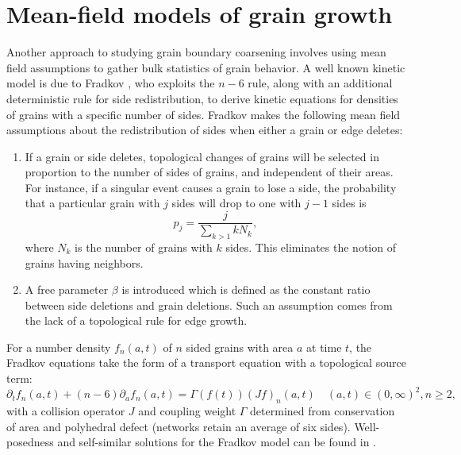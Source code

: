 \section{Mean-field models of grain growth}\label{fradkov}
Another approach to studying grain boundary coarsening involves using mean field assumptions to gather bulk statistics of grain behavior.  A well known kinetic model is due to Fradkov \cite{fra882,fra881}, who exploits  the $n-6$ rule, along with an additional deterministic rule for side redistribution, to derive kinetic equations for densities of grains with a specific number of sides.   Fradkov makes the following mean field assumptions about the redistribution of sides when either a grain or edge deletes:
\begin{enumerate}
\item If a grain or side deletes, topological changes of grains will be selected in proportion to the number of sides of grains, and independent of their areas.  For instance, if a singular event causes a grain to lose a side, the probability that a particular grain with $j$ sides will drop to one with $j-1$ sides is
\begin{equation}
p_j=\frac{j}{\sum_{k>1} kN_k},
\end{equation}
where $N_k$ is the number of grains with $k$ sides.  
  This eliminates the notion of grains having neighbors.  
\item A free parameter $\beta$ is introduced which is defined as the constant ratio between side deletions and grain deletions.  Such an assumption comes from the lack of a topological rule for edge growth.  
\end{enumerate}

For a number density $f_n(a,t)$ of $n $ sided grains with area $a$ at time $t$, the Fradkov equations take the form of a transport equation with a topological source term:
\begin{equation}
\partial_t f_n(a,t)+(n-6)\partial_a f_n(a,t) = \Gamma(f(t))(Jf)_n(a,t) \quad (a,t) \in (0,\infty)^2, n \ge 2 ,
\end{equation}
with a collision operator $J$ and coupling weight $\Gamma$ determined from conservation of area and polyhedral defect (networks retain an average of six sides). Well-posedness and self-similar solutions for the Fradkov model can be found in \cite{henseler2008kinetic, her12}.



 
